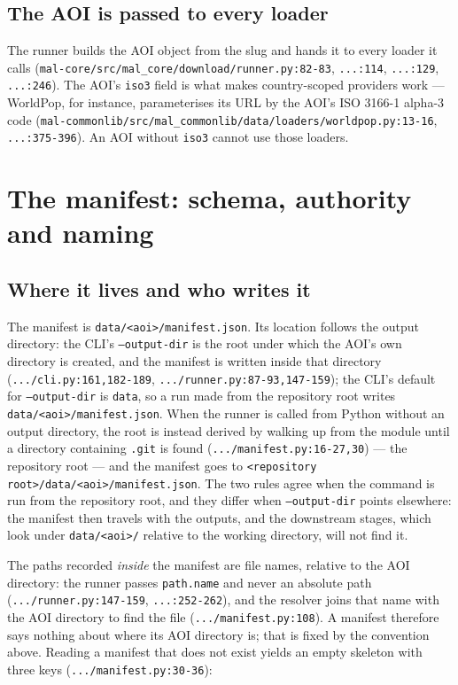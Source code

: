 \documentclass[11pt,a4paper]{article}
\newcommand{\code}[1]{\texttt{#1}}
\begin{document}
\subsection{The AOI is passed to every loader}

The runner builds the AOI object from the slug and hands it to every loader it
calls (\code{mal-core/src/mal\_core/download/runner.py:82-83},
\code{...:114}, \code{...:129}, \code{...:246}). The AOI's \code{iso3} field
is what makes country-scoped providers work --- WorldPop, for instance,
parameterises its URL by the AOI's ISO 3166-1 alpha-3 code
(\code{mal-commonlib/src/mal\_commonlib/data/loaders/worldpop.py:13-16},
\code{...:375-396}). An AOI without \code{iso3} cannot use those loaders.

\section{The manifest: schema, authority and naming}
\label{sec:manifest}

\subsection{Where it lives and who writes it}

The manifest is \code{data/<aoi>/manifest.json}. Its location follows the
output directory: the CLI's \code{--output-dir} is the root under which the
AOI's own directory is created, and the manifest is written inside that
directory (\code{.../cli.py:161,182-189},
\code{.../runner.py:87-93,147-159}); the CLI's default for
\code{--output-dir} is \code{data}, so a run made from the repository root
writes \code{data/<aoi>/manifest.json}. When the runner is called from
Python without an output directory, the root is instead derived by walking
up from the module until a directory containing \code{.git} is found
(\code{.../manifest.py:16-27,30}) --- the repository root --- and the
manifest goes to \code{<repository root>/data/<aoi>/manifest.json}. The two
rules agree when the command is run from the repository root, and they differ
when \code{--output-dir} points elsewhere: the manifest then travels with
the outputs, and the downstream stages, which look under \code{data/<aoi>/}
relative to the working directory, will not find it.

The paths recorded \emph{inside} the manifest are file names, relative to
the AOI directory: the runner passes \code{path.name} and never an absolute
path (\code{.../runner.py:147-159}, \code{...:252-262}), and the resolver
joins that name with the AOI directory to find the file
(\code{.../manifest.py:108}). A manifest therefore says nothing about where
its AOI directory is; that is fixed by the convention above. Reading a manifest
that does not exist yields an empty skeleton with three keys
(\code{.../manifest.py:30-36}):
\end{document}
